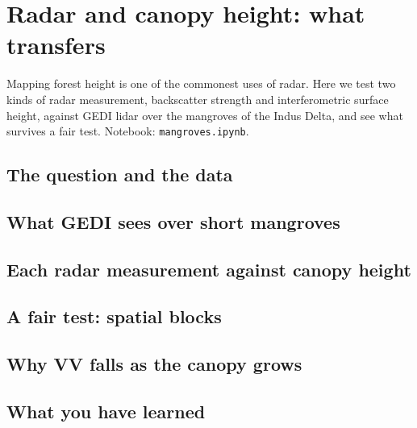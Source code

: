 \chapter{Radar and canopy height: what transfers}\label{ch:mangroves}
Mapping forest height is one of the commonest uses of radar. Here we test two kinds of radar measurement, backscatter strength and interferometric surface height, against GEDI lidar over the mangroves of the Indus Delta, and see what survives a fair test. Notebook: \texttt{mangroves.ipynb}.

\section{The question and the data}

\section{What GEDI sees over short mangroves}

\section{Each radar measurement against canopy height}

\section{A fair test: spatial blocks}

\section{Why VV falls as the canopy grows}

\section{What you have learned}

